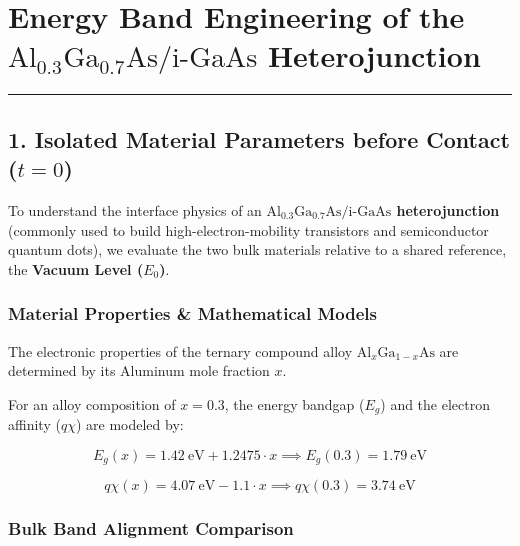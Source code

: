 \documentclass[
]{article}
\begin{document}
\section{\texorpdfstring{Energy Band Engineering of the
\(\text{Al}_{0.3}\text{Ga}_{0.7}\text{As} / \text{i-GaAs}\)
Heterojunction}{Energy Band Engineering of the \textbackslash text\{Al\}\_\{0.3\}\textbackslash text\{Ga\}\_\{0.7\}\textbackslash text\{As\} / \textbackslash text\{i-GaAs\} Heterojunction}}\label{energy-band-engineering-of-the-textal_0.3textga_0.7textas-texti-gaas-heterojunction}

\begin{center}\rule{0.5\linewidth}{0.5pt}\end{center}

\subsection{\texorpdfstring{1. Isolated Material Parameters before
Contact
(\(t = 0\))}{1. Isolated Material Parameters before Contact (t = 0)}}\label{isolated-material-parameters-before-contact-t-0}

To understand the interface physics of an
\textbf{\(\text{Al}_{0.3}\text{Ga}_{0.7}\text{As} / \text{i-GaAs}\)
heterojunction} (commonly used to build high-electron-mobility
transistors and semiconductor quantum dots), we evaluate the two bulk
materials relative to a shared reference, the \textbf{Vacuum Level
(\(E_0\))}.

\subsubsection{Material Properties \& Mathematical
Models}\label{material-properties-mathematical-models}

The electronic properties of the ternary compound alloy
\(\text{Al}_x\text{Ga}_{1-x}\text{As}\) are determined by its Aluminum
mole fraction \(x\).

For an alloy composition of \(x = 0.3\), the energy bandgap (\(E_g\))
and the electron affinity (\(q\chi\)) are modeled by:

\[E_g(x) = 1.42\ \text{eV} + 1.2475 \cdot x \implies E_g(0.3) = 1.79\ \text{eV}\]

\[q\chi(x) = 4.07\ \text{eV} - 1.1 \cdot x \implies q\chi(0.3) = 3.74\ \text{eV}\]

\subsubsection{Bulk Band Alignment
Comparison}\label{bulk-band-alignment-comparison}
\end{document}
